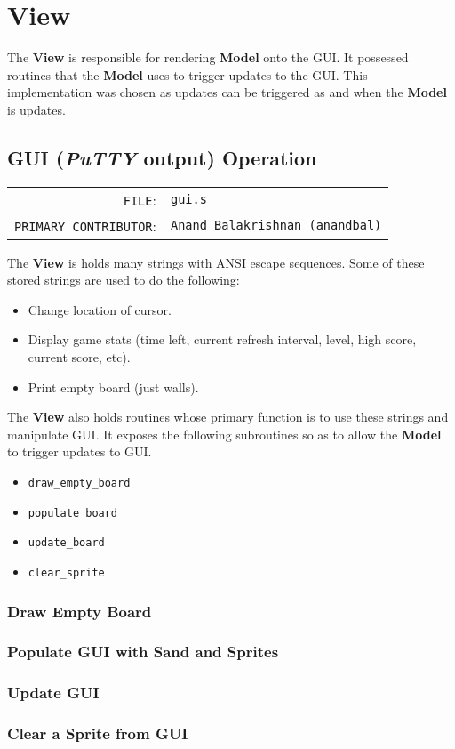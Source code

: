  \section{View}

  The \textbf{View} is responsible for rendering \textbf{Model} onto the GUI. It possessed routines that
  the \textbf{Model} uses to trigger updates to the GUI. This implementation was chosen as updates can
  be triggered as and when the \textbf{Model} is updates.

  \subsection{GUI (\textit{PuTTY} output) Operation}
  \begin{table}[H]
  \begin{tabular}{rl}
    \texttt{FILE}:         &\texttt{gui.s}  \\
    \texttt{PRIMARY CONTRIBUTOR}:    &\texttt{Anand Balakrishnan (anandbal)}
  \end{tabular}
  \end{table}

    The \textbf{View} is holds many strings with ANSI escape sequences. Some of these stored strings are used to do the following:

    \begin{itemize}
      \item Change location of cursor.
      \item Display game stats (time left, current refresh interval, level, high score, current score, etc).
      \item Print empty board (just walls).
    \end{itemize}

    The \textbf{View} also holds routines whose primary function is to use these strings and manipulate GUI.
    It exposes the following subroutines so as to allow the \textbf{Model} to trigger updates to GUI.

    \begin{itemize}
      \item \texttt{draw\_empty\_board}
      \item \texttt{populate\_board}
      \item \texttt{update\_board}
      \item \texttt{clear\_sprite}
    \end{itemize}

    \subsubsection{Draw Empty Board}
    
    \subsubsection{Populate GUI with Sand and Sprites}

    \subsubsection{Update GUI}

    \subsubsection{Clear a Sprite from GUI}




